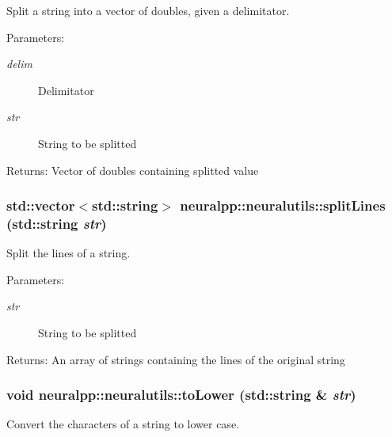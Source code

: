 Split a string into a vector of doubles, given a delimitator. 

\begin{Desc}
\item[Parameters:]
\begin{description}
\item[{\em delim}]Delimitator \item[{\em str}]String to be splitted \end{description}
\end{Desc}
\begin{Desc}
\item[Returns:]Vector of doubles containing splitted value \end{Desc}
\subsubsection[splitLines]{\setlength{\rightskip}{0pt plus 5cm}std::vector$<$std::string$>$ neuralpp::neuralutils::splitLines (std::string {\em str})}\label{namespaceneuralpp_1_1neuralutils_1d887e4bcc7ef2d50cbeca984767a78b}


Split the lines of a string. 

\begin{Desc}
\item[Parameters:]
\begin{description}
\item[{\em str}]String to be splitted \end{description}
\end{Desc}
\begin{Desc}
\item[Returns:]An array of strings containing the lines of the original string \end{Desc}
\subsubsection[toLower]{\setlength{\rightskip}{0pt plus 5cm}void neuralpp::neuralutils::toLower (std::string \& {\em str})}\label{namespaceneuralpp_1_1neuralutils_f7932c25bd82b19173d2f3d2e5cef488}


Convert the characters of a string to lower case. 

